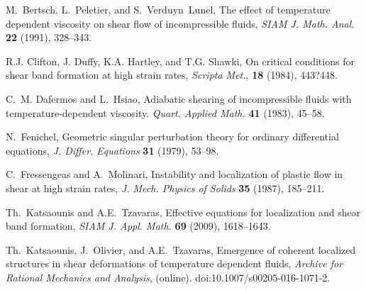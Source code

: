 \documentclass[graybox]{svmult}
\begin{document}
\begin{thebibliography}{10}


{\sc M.~Bertsch, L.~Peletier, and S.~Verduyn~Lunel}, 
The effect of temperature dependent viscosity on shear flow of  incompressible fluids,
{\em SIAM J. Math. Anal.} {\bf 22 } (1991), 328--343.

{\sc R.J. Clifton, J. Duffy, K.A. Hartley, and T.G. Shawki}, 
On critical conditions for shear band formation at high strain rates, 
{\em Scripta Met.}, {\bf 18} (1984), 443?448.


{\sc C.~M. Dafermos and L.~Hsiao}, 
Adiabatic shearing of incompressible fluids with temperature-dependent viscosity.
{\em Quart.  Applied Math.} {\bf 41} (1983), 45--58.


{\sc N.~Fenichel}, 
Geometric singular perturbation theory for ordinary differential equations, 
{\it J. Differ. Equations} {\bf 31} (1979), 53--98.

{\sc C.~Fressengeas and A.~Molinari}, 
Instability and localization of plastic flow in shear at high strain rates, 
  {\em J.  Mech. Physics of Solids} {\bf 35} (1987), 185--211.

  
{\sc Th.~Katsaounis and A.E.~Tzavaras}, 
 Effective equations for localization and shear band formation, 
 {\em SIAM J. Appl. Math.}  {\bf 69} (2009), 1618--1643.
  
{\sc Th.~Katsaounis, J.~Olivier, and A.E.~Tzavaras}, 
Emergence of coherent localized structures in shear deformations of temperature dependent fluids, {\em Archive for Rational Mechanics and Analysis}, (online). doi:10.1007/s00205-016-1071-2.


\end{thebibliography}
\end{document}
